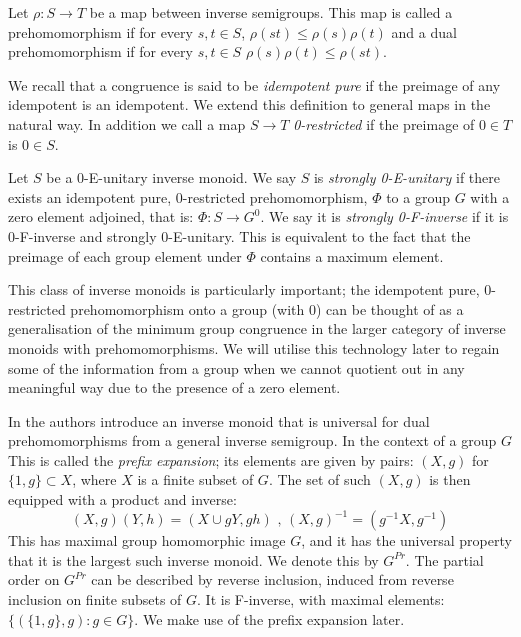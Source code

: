 \begin{definition}
Let $\rho: S \rightarrow T$ be a map between inverse semigroups. This map is called a prehomomorphism if for every $s,t \in S$, $\rho(st) \leq \rho(s)\rho(t)$ and a dual prehomomorphism if for every $s,t \in S$ $\rho(s)\rho(t) \leq \rho(st)$.
\end{definition}

We recall that a congruence is said to be \textit{idempotent pure} if the preimage of any idempotent is an idempotent. We extend this definition to general maps in the natural way. In addition we call a map $S \rightarrow T$ \textit{0-restricted} if the preimage of $0 \in T$ is $0 \in S$.

\begin{definition}
Let $S$ be a 0-E-unitary inverse monoid. We say $S$ is \textit{strongly 0-E-unitary} if there exists an idempotent pure, 0-restricted prehomomorphism, $\Phi$ to a group $G$ with a zero element adjoined, that is: $\Phi:S \rightarrow G^{0}$. We say it is \textit{strongly 0-F-inverse} if it is 0-F-inverse and strongly 0-E-unitary. This is equivalent to the fact that the preimage of each group element under $\Phi$ contains a maximum element.
\end{definition}

This class of inverse monoids is particularly important; the idempotent pure, 0-restricted prehomomorphism onto a group (with 0) can be thought of as a generalisation of the minimum group congruence in the larger category of inverse monoids with prehomomorphisms. We will utilise this technology later to regain some of the information from a group when we cannot quotient out in any meaningful way due to the presence of a zero element.

\begin{example}
In \cite{MR745358,MR2221438} the authors introduce an inverse monoid that is universal for dual prehomomorphisms from a general inverse semigroup. In the context of a group $G$ This is called the \textit{prefix expansion}; its elements are given by pairs: $(X,g)$ for $\lbrace 1,g\rbrace \subset X$, where $X$ is a finite subset of $G$. The set of such $(X,g)$ is then equipped with a product and inverse:
\begin{equation*}
(X,g)(Y,h) = (X\cup gY,gh)\mbox{ , } (X,g)^{-1}=(g^{-1}X,g^{-1})
\end{equation*}
This has maximal group homomorphic image $G$, and it has the universal property that it is the largest such inverse monoid. We denote this by $G^{Pr}$. The partial order on $G^{Pr}$ can be described by reverse inclusion, induced from reverse inclusion on finite subsets of $G$. It is F-inverse, with maximal elements: $\lbrace(\lbrace 1,g \rbrace, g):g \in G \rbrace$. We make use of the prefix expansion later.
\end{example}

